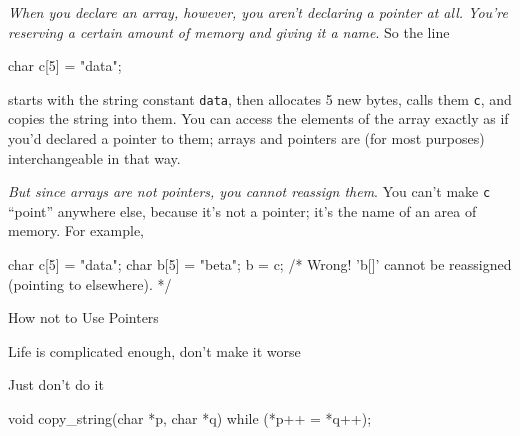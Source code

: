 \emph{When you declare an array, however, you aren't declaring a pointer at all. You're reserving a certain amount of memory and giving it a name}. So the line

\begin{ccode}
char c[5] = "data";
\end{ccode}

starts with the string constant \texttt{data}, then allocates 5 new bytes, calls them \texttt{c}, and copies the string into them. You can access the elements of the array exactly as if you'd declared a pointer to them; arrays and pointers are (for most purposes) interchangeable in that way.

\emph{But since arrays are not pointers, you cannot reassign them}. You can't make
\texttt{c} ``point'' anywhere else, because it's not a pointer; it's the name of an area of
memory. For example,

\begin{ccode}
char c[5] = "data";
char b[5] = "beta";
b = c; /* Wrong! 'b[]' cannot be reassigned (pointing to elsewhere). */
\end{ccode}

\begin{frame}[fragile=singleslide]{How not to Use Pointers}
  \begin{block}{Life is complicated enough, don't make it worse}
  \end{block}
\end{frame}

\begin{frame}[fragile]
  \begin{block}{Just don't do it}
\begin{ccode}
void copy_string(char *p, char *q)
{
  while (*p++ = *q++);
}
\end{ccode}
  \end{block}
\end{frame}

